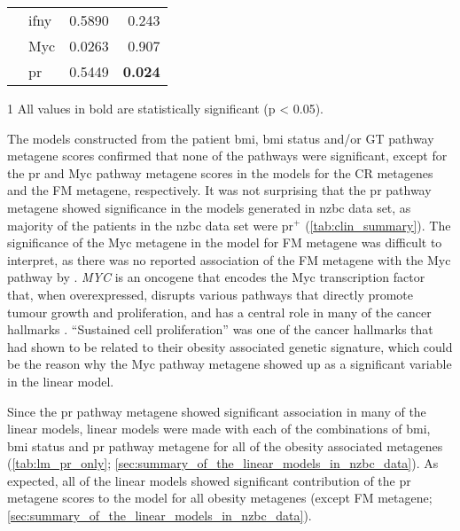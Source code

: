 \begin{table}[htpb]
\begin{threeparttable}
\begin{tabular}{llrr}
                                                                       & \gls{ifny} & 0.5890  & 0.243\\
                                                                       & Myc        & 0.0263  & 0.907\\
                                                                       & \gls{pr}   & 0.5449  & \textbf{0.024}\\
			\hline
			\hline
		\end{tabular}
		\begin{tablenotes}
			\begin{footnotesize}
				\item [1] All values in bold are statistically significant (p \textless{} 0.05).
			\end{footnotesize}
		\end{tablenotes}
	\end{threeparttable}
\end{table}

The models constructed from the patient \gls{bmi}, \gls{bmi} status and/or GT pathway metagene scores confirmed that none of the pathways were significant, except for the \gls{pr} and Myc pathway metagene scores in the models for the CR metagenes and the FM metagene, respectively.
It was not surprising that the \gls{pr} pathway metagene showed significance in the models generated in \gls{nzbc} data set, as majority of the patients in the \gls{nzbc} data set were \gls{pr}$^+$ (\cref{tab:clin_summary}).
The significance of the Myc metagene in the model for FM metagene was difficult to interpret, as there was no reported association of the FM metagene with the Myc pathway by \citet{Fuentes-Mattei2014}.
\textit{MYC} is an oncogene that encodes the Myc transcription factor that, when overexpressed, disrupts various pathways that directly promote tumour growth and proliferation, and has a central role in many of the cancer hallmarks \citep{Coller2000,Hanahan2000}.
``Sustained cell proliferation'' was one of the cancer hallmarks that \citet{Fuentes-Mattei2014} had shown to be related to their obesity associated genetic signature, which could be the reason why the Myc pathway metagene showed up as a significant variable in the linear model.

Since the \gls{pr} pathway metagene showed significant association in many of the linear models, linear models were made with each of the combinations of \gls{bmi}, \gls{bmi} status and \gls{pr} pathway metagene for all of the obesity associated metagenes (\cref{tab:lm_pr_only}; \cref{sec:summary_of_the_linear_models_in_nzbc_data}).
As expected, all of the linear models showed significant contribution of the \gls{pr} metagene scores to the model for all obesity metagenes (except FM metagene; \cref{sec:summary_of_the_linear_models_in_nzbc_data}).

